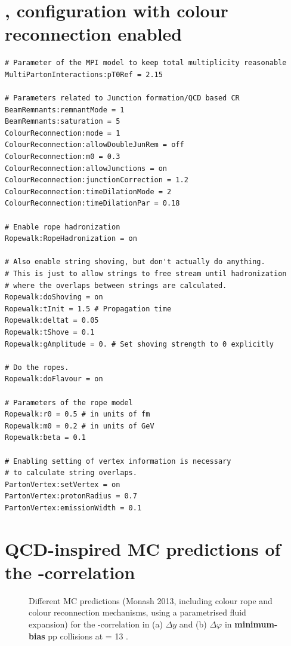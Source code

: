 \section{\Pythiaeight, configuration with colour reconnection enabled}
\label{sec:AppPythia8CR}
\begin{verbatim}
# Parameter of the MPI model to keep total multiplicity reasonable
MultiPartonInteractions:pT0Ref = 2.15

# Parameters related to Junction formation/QCD based CR
BeamRemnants:remnantMode = 1
BeamRemnants:saturation = 5
ColourReconnection:mode = 1
ColourReconnection:allowDoubleJunRem = off
ColourReconnection:m0 = 0.3
ColourReconnection:allowJunctions = on
ColourReconnection:junctionCorrection = 1.2
ColourReconnection:timeDilationMode = 2
ColourReconnection:timeDilationPar = 0.18

# Enable rope hadronization
Ropewalk:RopeHadronization = on

# Also enable string shoving, but don't actually do anything.
# This is just to allow strings to free stream until hadronization
# where the overlaps between strings are calculated.
Ropewalk:doShoving = on
Ropewalk:tInit = 1.5 # Propagation time
Ropewalk:deltat = 0.05
Ropewalk:tShove = 0.1
Ropewalk:gAmplitude = 0. # Set shoving strength to 0 explicitly

# Do the ropes.
Ropewalk:doFlavour = on

# Parameters of the rope model
Ropewalk:r0 = 0.5 # in units of fm
Ropewalk:m0 = 0.2 # in units of GeV
Ropewalk:beta = 0.1

# Enabling setting of vertex information is necessary
# to calculate string overlaps.
PartonVertex:setVertex = on
PartonVertex:protonRadius = 0.7
PartonVertex:emissionWidth = 0.1
\end{verbatim}

\section{QCD-inspired MC predictions of the \rmOmegaPM-\rmPhiMes correlation}
\label{sec:MCPredictionsOmegaMB}

\begin{figure}[!p]
\centering
{}
\centering
{}
\caption{Different MC predictions (\Pythiaeight Monash 2013, \Pythiaeight including colour rope and colour reconnection mechanisms, \EposFour using a parametrised fluid expansion) for the \rmOmegaPM-\rmPhiMes correlation in (a) $\Delta y$ and (b) $\Delta \varphi$ in \textbf{minimum-bias} pp collisions at \sqrtS = 13 \tev.}
	\label{fig:MCPredictionsOmega}
\end{figure}


